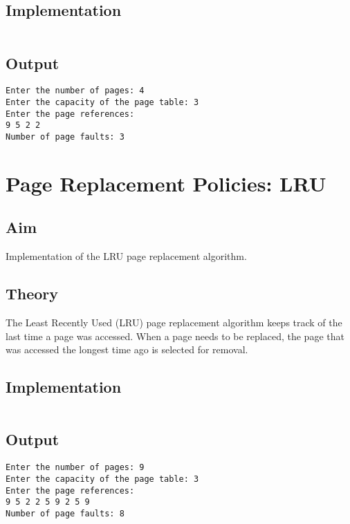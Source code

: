 \subsection{Implementation}

\inputminted[fontsize=\footnotesize]{c}{code/page_fifo.c}

\subsection{Output}
\begin{lstlisting}[style=output]
Enter the number of pages: 4
Enter the capacity of the page table: 3
Enter the page references:
9 5 2 2
Number of page faults: 3
\end{lstlisting}

\section{Page Replacement Policies: LRU}
\label{sec:page-replacement-lru}

\subsection{Aim}
Implementation of the LRU page replacement algorithm.

\subsection{Theory}
The Least Recently Used (LRU) page replacement algorithm
keeps track of the last time a page was accessed.
When a page needs to be replaced, the page that was accessed the longest time ago is selected for removal.

\subsection{Implementation}

\inputminted[fontsize=\footnotesize]{c}{code/page_lru.c}

\subsection{Output}
\begin{lstlisting}[style=output]
Enter the number of pages: 9
Enter the capacity of the page table: 3
Enter the page references:
9 5 2 2 5 9 2 5 9
Number of page faults: 8
\end{lstlisting}
